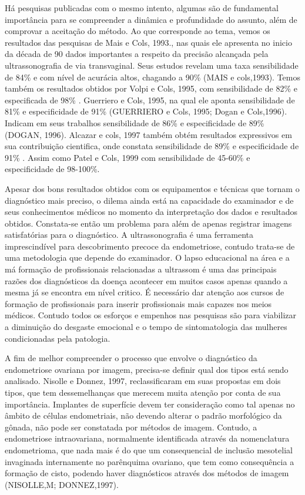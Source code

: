\documentclass[12pt]{article} %
\begin{document}
Há pesquisas publicadas com o mesmo intento, algumas são de fundamental importância para se compreender a dinâmica e profundidade do assunto, além de comprovar a aceitação do método. Ao que corresponde ao tema, vemos os resultados das pesquisas de Mais e Cols, 1993., nas quais ele apresenta no inicio da década de 90 dados importantes a respeito da precisão alcançada pela ultrassonografia de via transvaginal. Seus estudos revelam uma taxa sensibilidade de 84\% e com nível de acurácia altos, chagando a 90\% (MAIS e cols,1993). Temos também os resultados obtidos por Volpi e Cols, 1995, com sensibilidade de 82\% e especificada de 98\% .  Guerriero e Cols, 1995,  na qual ele aponta sensibilidade de 81\% e especificidade de 91\% (GUERRIERO e Cols, 1995; Dogan e Cols,1996). Indicam em seus trabalhos sensibilidade de 86\% e especificidade de 89\% (DOGAN, 1996). Alcazar e cols, 1997 também obtém resultados expressivos em sua contribuição cientifica, onde constata sensibilidade de 89\% e especificidade de 91\% . Assim como Patel e Cols, 1999 com sensibilidade de 45-60\% e especificidade de 98-100\%. 

Apesar dos bons resultados obtidos com os equipamentos e técnicas que tornam o
diagnóstico mais preciso, o dilema ainda está na capacidade do examinador e de seus conhecimentos médicos no momento da interpretação dos dados e resultados obtidos.  Constata-se então um problema para além de apenas registrar imagens satisfatórias para o diagnóstico. A ultrassonografia é uma ferramenta imprescindível para descobrimento precoce da endometriose, contudo trata-se de uma metodologia que depende do examinador. O lapso educacional na área e a má formação de profissionais relacionadas a ultrassom é uma das principais razões dos diagnósticos da doença acontecer em muitos casos apenas quando a mesma já se encontra em nível critico. É necessário dar atenção aos cursos de formação de profissionais para inserir profissionais mais capazes nos meios médicos. Contudo todos os esforços e empenhos nas pesquisas são para viabilizar a diminuição do desgaste emocional e o tempo de sintomatologia das mulheres condicionadas pela patologia. 

A fim de melhor compreender o processo que envolve o diagnóstico da endometriose ovariana por imagem, precisa-se definir qual dos tipos está sendo analisado. Nisolle e Donnez, 1997, reclassificaram em suas propostas em dois tipos, que tem dessemelhanças que merecem muita atenção por conta de sua importância. Implantes de superfície devem ter consideração como tal apenas no âmbito de células endometriais, não devendo alterar o padrão morfológico da gônada, não pode ser constatada por métodos de imagem. Contudo, a endometriose intraovariana, normalmente identificada através da nomenclatura endometrioma, que nada mais é do que um consequencial de inclusão mesotelial invaginada internamente no parênquima ovariano, que tem como consequência a formação de cisto, podendo haver diagnósticos através dos métodos de imagem (NISOLLE,M; DONNEZ,1997). 
\end{document}
